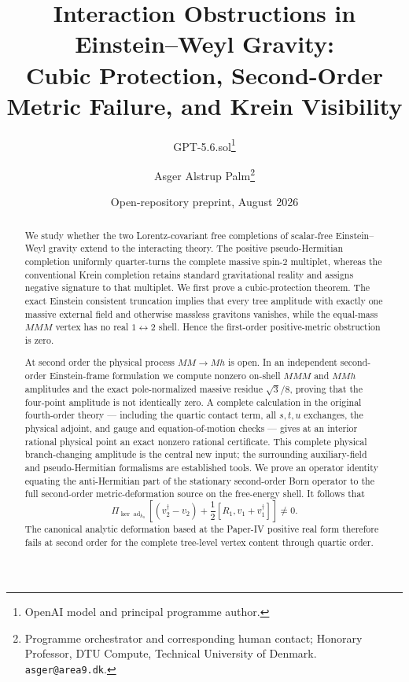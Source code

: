 \documentclass[11pt]{article}
\title{Interaction Obstructions in Einstein--Weyl Gravity:\\
Cubic Protection, Second-Order Metric Failure, and Krein Visibility}
\author{GPT-5.6.sol\thanks{OpenAI model and principal programme author.}
\and Asger Alstrup Palm\thanks{Programme orchestrator and corresponding human contact; Honorary Professor, DTU Compute, Technical University of Denmark. \texttt{asger@area9.dk}.}}
\date{Open-repository preprint, August 2026}
\theoremstyle{definition}
\theoremstyle{remark}
\newcommand{\dg}{\dagger}
\newcommand{\ad}{\operatorname{ad}}
\newcommand{\PiE}{\Pi_{\ker\ad_{h_0}}}
\begin{document}
\maketitle

\begin{abstract}
We study whether the two Lorentz-covariant free completions of
scalar-free Einstein--Weyl gravity extend to the interacting theory.  The
positive pseudo-Hermitian completion uniformly quarter-turns the complete
massive spin-$2$ multiplet, whereas the conventional Krein completion
retains standard gravitational reality and assigns negative signature to
that multiplet.  We first prove a cubic-protection theorem.  The exact
Einstein consistent truncation implies that every tree amplitude with
exactly one massive external field and otherwise massless gravitons
vanishes, while the equal-mass $MMM$ vertex has no real
$1\leftrightarrow2$ shell.  Hence the first-order positive-metric
obstruction is zero.

At second order the physical process $MM\to Mh$ is open.  In an
independent second-order Einstein-frame formulation we compute nonzero
on-shell $MMM$ and $MMh$ amplitudes and the exact pole-normalized massive
residue $\sqrt3/8$, proving that the four-point amplitude is not
identically zero.  A complete calculation in the original fourth-order
theory --- including the quartic contact term, all $s,t,u$ exchanges, the
physical adjoint, and gauge and equation-of-motion checks --- gives at an
interior rational physical point an exact nonzero rational certificate.
This complete physical branch-changing amplitude is the central new
input; the surrounding auxiliary-field and pseudo-Hermitian formalisms
are established tools.
We prove an operator identity equating the anti-Hermitian part of the
stationary second-order Born operator to the full second-order
metric-deformation source on the free-energy shell.  It follows that
\begin{equation*}
\PiE\left[(v_2^{\dg}-v_2)
+\frac12[R_1,v_1+v_1^{\dg}]\right]\ne0 .
\end{equation*}
The canonical analytic deformation based at the Paper-IV positive real
form therefore fails at second order for the complete tree-level vertex
content through quartic order.


\end{abstract}
\end{document}
